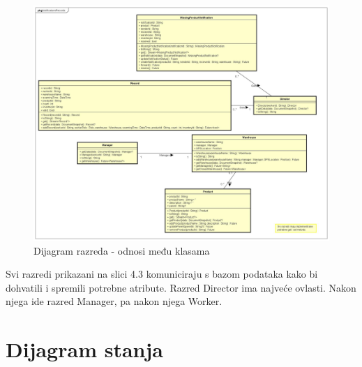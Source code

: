 			\begin{figure}[H]
				\centering
				\includegraphics[width=1.0\linewidth]{"slike/Class Diagram1"}
				\caption{Dijagram razreda - odnosi među klasama}
				\label{Slika 4.3}
			\end{figure}
			
			Svi razredi prikazani na slici 4.3 komuniciraju s bazom podataka kako bi dohvatili i spremili potrebne atribute. Razred Director ima najveće ovlasti. Nakon njega ide razred Manager, pa nakon njega Worker.
			

			
			
			\eject
		
		\section{Dijagram stanja}
			

		
